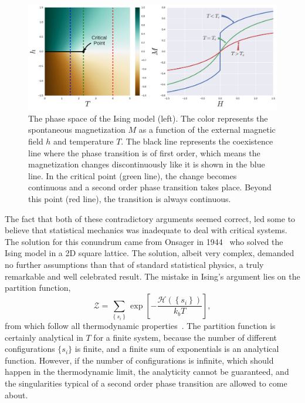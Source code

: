 \begin{figure}[t]
\begin{center}
    \includegraphics[width=\textwidth]{chapters/ch2-crit/figs/ising_phase2}
\end{center}
\caption{The phase space of the Ising model (left). The color represents the
    spontaneous magnetization $M$ as a function of the external magnetic field
    $h$ and temperature $T$. The black line represents the coexistence line
    where the phase transition is of first order, which means the magnetization
    changes discontinuously like it is shown in the blue line. In the critical
    point (green line), the change becomes continuous and a second order phase
    transition takes place. Beyond this point (red line), the transition is
    always continuous.}
\label{fig:ising_phase2}
\end{figure}

The fact that both of these contradictory arguments seemed correct, led some to
believe that statistical mechanics was inadequate to deal with critical
systems. The solution for this conundrum came from Onsager in
1944~\cite{Onsager1944} who solved the Ising model in a 2D square lattice. The
solution, albeit very complex, demanded no further assumptions than that of
standard statistical physics, a truly remarkable and well celebrated result.
The mistake in Ising's argument lies on the partition function,
\begin{equation}
    \mathcal{Z}=
    \sum_{\left\{ s_{i}\right\} }
    \exp\left[
        -\frac{\mathcal{H}\left(\left\{ s_{i}\right\} \right)}{k_{b}T}
    \right],
\end{equation}
from which follow all thermodynamic properties~\cite{Pathria1996}. The
partition function is certainly analytical in $T$ for a finite system, because
the number of different configurations $\{s_i\}$ is finite, and a finite sum of
exponentials is an analytical function. However, if the number of
configurations is infinite, which should happen in the thermodynamic limit, the
analyticity cannot be guaranteed, and the singularities typical of a second
order phase transition are allowed to come about.

